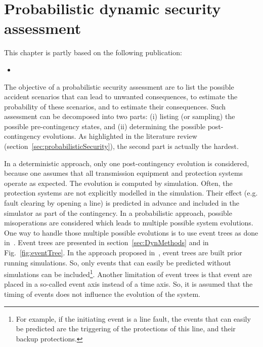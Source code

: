 \chapter{Probabilistic dynamic security assessment}
\label{ch:DPSA}

This chapter is partly based on the following publication:
\begin{itemize}
    \item {}
\end{itemize}




The objective of a probabilistic security assessment are to list the possible accident scenarios that can lead to unwanted consequences, to estimate the probability of these scenarios, and to estimate their consequences. Such assessment can be decomposed into two parts: (i) listing (or sampling) the possible pre-contingency states, and (ii) determining the possible post-contingency evolutions. As highlighted in the literature review (section~\ref{sec:probabilisticSecurity}), the second part is actually the hardest. 

In a deterministic approach, only one post-contingency evolution is considered, because one assumes that all transmission equipment and protection systems operate as expected. The evolution is computed by simulation. Often, the protection systems are not explicitly modelled in the simulation. Their effect (e.g. fault clearing by opening a line) is predicted in advance and included in the simulator as part of the contingency. In a probabilistic approach, possible misoperations are considered which leads to multiple possible system evolutions. One way to handle those multiple possible evolutions is to use event trees as done in~\cite{Haarla, GridPSA}. Event trees are presented in section~\ref{sec:DynMethods} and in Fig.~\ref{fig:eventTree}. In the approach proposed in~\cite{Haarla, GridPSA}, event trees are built prior running simulations. So, only events that can easily be predicted without simulations can be included\footnote{For example, if the initiating event is a line fault, the events that can easily be predicted are the triggering of the protections of this line, and their backup protections.}. Another limitation of event trees is that event are placed in a so-called event axis instead of a time axis. So, it is assumed that the timing of events does not influence the evolution of the system.

